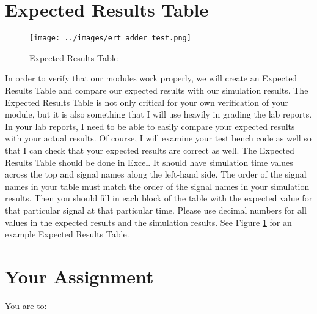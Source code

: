 \section{Expected Results Table}
\begin{figure}
	\caption{Expected Results Table}\label{fig:ert_adder_test}
	\begin{center}
		\texttt{[image: ../images/ert\_adder\_test.png]}
	\end{center}
\end{figure} 
In order to verify that our modules work properly, we will create an Expected Results Table and compare our expected results with our simulation results.  The Expected Results Table is not only critical for your own verification of your module, but it is also something that I will use heavily in grading the lab reports.  In your lab reports, I need to be able to easily compare your expected results with your actual results.  Of course, I will examine your test bench code as well so that I can check that your expected results are correct as well.  The Expected Results Table should be done in Excel.  It should have simulation time values across the top and signal names along the left-hand side.  The order of the signal names in your table must match the order of the signal names in your simulation results.  Then you should fill in each block of the table with the expected value for that particular signal at that particular time.  Please use decimal numbers for all values in the expected results and the simulation results. See Figure \ref{fig:ert_adder_test} for an example Expected Results Table.

\section{Your Assignment}

You are to:
